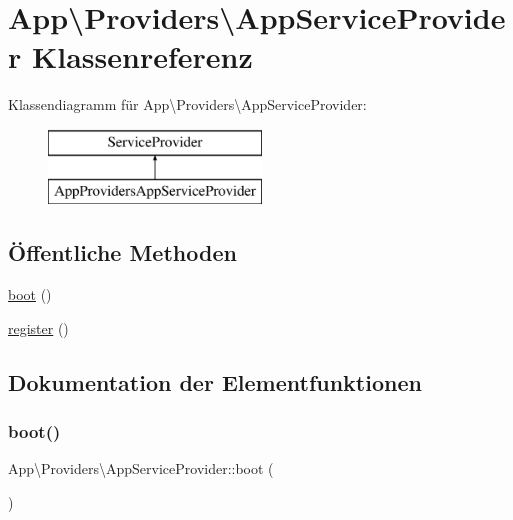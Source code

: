 \hypertarget{classApp_1_1Providers_1_1AppServiceProvider}{}\section{App\textbackslash{}Providers\textbackslash{}App\+Service\+Provider Klassenreferenz}
\label{classApp_1_1Providers_1_1AppServiceProvider}
Klassendiagramm für App\textbackslash{}Providers\textbackslash{}App\+Service\+Provider\+:\begin{figure}[H]
\begin{center}
\leavevmode
\includegraphics[height=2.000000cm]{da/d86/classApp_1_1Providers_1_1AppServiceProvider}
\end{center}
\end{figure}
\subsection*{Öffentliche Methoden}
\begin{DoxyCompactItemize}
\item 
\hyperlink{classApp_1_1Providers_1_1AppServiceProvider_ace5b6b100b2a3d1ee0f006501bb6b02f}{boot} ()
\item 
\hyperlink{classApp_1_1Providers_1_1AppServiceProvider_a2853e71d5b5c0d013d755b0265da3a9f}{register} ()
\end{DoxyCompactItemize}


\subsection{Dokumentation der Elementfunktionen}
\mbox{\label{classApp_1_1Providers_1_1AppServiceProvider_ace5b6b100b2a3d1ee0f006501bb6b02f}} 
\subsubsection{\texorpdfstring{boot()}{boot()}}
{\footnotesize\ttfamily App\textbackslash{}\+Providers\textbackslash{}\+App\+Service\+Provider\+::boot (\begin{DoxyParamCaption}{ }\end{DoxyParamCaption})}

